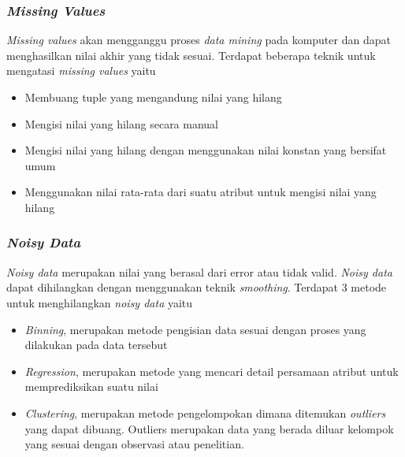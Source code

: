 \subsubsection{\textsl{Missing Values}}
\textsl{Missing values} akan mengganggu proses \textsl{data mining} pada komputer dan dapat menghasilkan nilai akhir yang tidak sesuai. Terdapat beberapa teknik untuk mengatasi \textsl{missing values} yaitu
	\begin{itemize}
		\item Membuang tuple yang mengandung nilai yang hilang\textit{\textit{}}
		\item Mengisi nilai yang hilang secara manual
		\item Mengisi nilai yang hilang dengan menggunakan nilai konstan yang bersifat umum
		\item Menggunakan nilai rata-rata dari suatu atribut untuk mengisi nilai yang hilang
	\end{itemize}
\subsubsection{\textsl{Noisy Data}}
\textsl{Noisy data} merupakan nilai yang berasal dari error atau tidak valid. \textsl{Noisy data} dapat dihilangkan dengan menggunakan teknik \textsl{smoothing}. Terdapat 3 metode untuk menghilangkan \textsl{noisy data} yaitu
	\label{teknikBinning}
	\begin{itemize}
		\item \textsl{Binning}, merupakan metode pengisian data sesuai dengan proses yang dilakukan pada data tersebut
		\item \textsl{Regression}, merupakan metode yang mencari detail persamaan atribut untuk memprediksikan suatu nilai
		\item	\textsl{Clustering}, merupakan metode pengelompokan dimana ditemukan \textsl{outliers} yang dapat dibuang. Outliers merupakan data yang berada diluar kelompok yang sesuai dengan observasi atau penelitian.
	\end{itemize}


